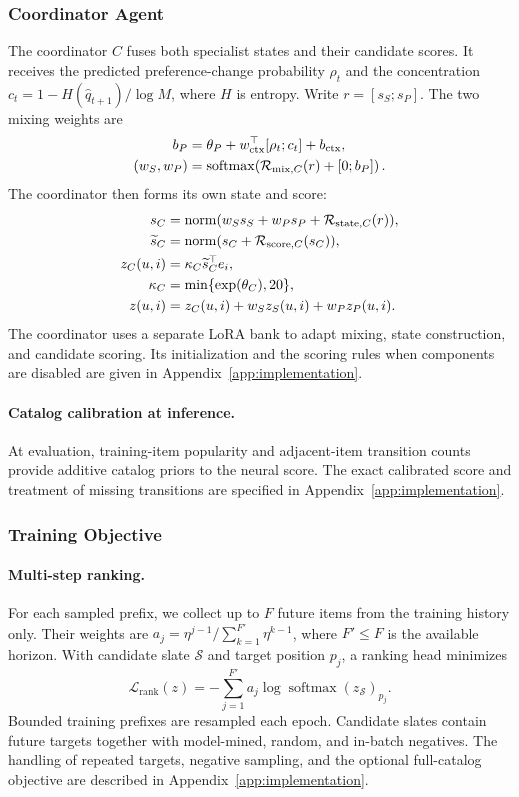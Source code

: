\documentclass[11pt]{article}
\newcommand{\norm}[1]{\operatorname{norm}(#1)}
\newcommand{\softmax}{\operatorname{softmax}}
\begin{document}
\subsubsection{Coordinator Agent}
The coordinator $C$ fuses both specialist states and their candidate scores. It receives the predicted preference-change probability $\rho_t$ and the concentration $c_t=1-H(\widehat q_{t+1})/\log M$, where $H$ is entropy. Write $r=[s_S;s_P]$. The two mixing weights are
\begin{align}
 b_P&=\theta_P+w_{\mathrm{ctx}}^\top[\rho_t;c_t]+b_{\mathrm{ctx}},\notag\\
 (w_S,w_P)&=\softmax\!\left(\mathcal R_{\mathrm{mix},C}(r)+[0;b_P]\right).
\end{align}
The coordinator then forms its own state and score:
\begin{align}
 s_C&=\norm{w_Ss_S+w_Ps_P+\mathcal R_{\mathrm{state},C}(r)},\notag\\
 \widetilde s_C&=\norm{s_C+\mathcal R_{\mathrm{score},C}(s_C)},\notag\\
  z_C(u,i)&=\kappa_C\widetilde s_C^\top e_i,\notag\\
  \kappa_C&=\min\{\exp(\theta_C),20\},\notag\\
 z(u,i)&=z_C(u,i)+w_Sz_S(u,i)+w_Pz_P(u,i).
\end{align}
The coordinator uses a separate LoRA bank to adapt mixing, state construction, and candidate scoring. Its initialization and the scoring rules when components are disabled are given in Appendix~\ref{app:implementation}.

\paragraph{Catalog calibration at inference.}
At evaluation, training-item popularity and adjacent-item transition counts provide additive catalog priors to the neural score. The exact calibrated score and treatment of missing transitions are specified in Appendix~\ref{app:implementation}.

\subsubsection{Training Objective}
\paragraph{Multi-step ranking.}
For each sampled prefix, we collect up to $F$ future items from the training history only. Their weights are $a_j=\eta^{j-1}/\sum_{k=1}^{F'}\eta^{k-1}$, where $F'\leq F$ is the available horizon. With candidate slate $\mathcal S$ and target position $p_j$, a ranking head minimizes
\begin{equation}
 \mathcal L_{\mathrm{rank}}(z)
 =-\sum_{j=1}^{F'}a_j\log\softmax(z_{\mathcal S})_{p_j}.
\end{equation}
Bounded training prefixes are resampled each epoch. Candidate slates contain future targets together with model-mined, random, and in-batch negatives. The handling of repeated targets, negative sampling, and the optional full-catalog objective are described in Appendix~\ref{app:implementation}.
\end{document}
